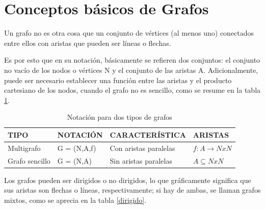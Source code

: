 \section{Conceptos básicos de Grafos}
Un grafo no es otra cosa que un conjunto de vértices (al menos uno) conectados entre ellos con aristas que pueden ser líneas o flechas. 

Es por esto que en su notación, básicamente se refieren dos conjuntos: el conjunto no vacío de los nodos o vértices N y el conjunto de las aristas A. Adicionalmente, puede ser necesario establecer una función entre las aristas y el producto cartesiano de los nodos, cuando el grafo no es sencillo, como se resume en la tabla \ref{tab:notgraf}.

\begin{table}[H] 
\caption{Notación para dos tipos de grafos}
\centering
\begin{tabular}{llll}
\textbf{TIPO}                        & \textbf{NOTACIÓN}                & \textbf{CARACTERÍSTICA}                    & \textbf{ARISTAS}                           \\ \hline
\multicolumn{1}{|l|}{Multigrafo}     & \multicolumn{1}{l|}{G = (N,A,f)} & \multicolumn{1}{l|}{Con aristas paralelas} & \multicolumn{1}{l|}{$f:A \rightarrow NxN$} \\ \hline
\multicolumn{1}{|l|}{Grafo sencillo} & \multicolumn{1}{l|}{G = (N,A)}   & \multicolumn{1}{l|}{Sin aristas paralelas} & \multicolumn{1}{l|}{$A \subseteq NxN$}               \\ \hline
\end{tabular}
\label{tab:notgraf}
\end{table}

Los grafos pueden ser dirigidos o no dirigidos, lo que gráficamente significa que sus aristas son flechas o líneas, respectivamente; si hay de ambas, se llaman grafos mixtos, como se aprecia en la tabla \ref{dirigido}.

